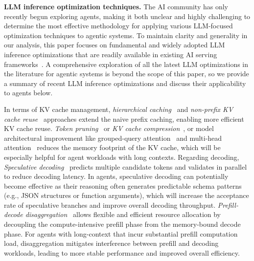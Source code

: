 \textbf{LLM inference optimization techniques.}
The AI community has only recently begun exploring agents, making it both unclear and highly challenging to determine the most effective methodology for applying various LLM-focused optimization techniques to agentic systems. To maintain clarity and generality in our analysis, this paper focuses on fundamental and widely adopted LLM inference optimizations that are readily available in existing AI serving frameworks~\cite{vllm,zheng2024sglang}. A comprehensive exploration of all the latest LLM optimizations in the literature for agentic systems is beyond the scope of this paper, so we provide a summary of recent LLM inference optimizations and discuss their applicability to agents below. 

In terms of KV cache management, \textit{hierarchical caching}~\cite{cachedattention,infinigen,multiturn} and \textit{non-prefix KV cache reuse}~\cite{cacheblend} approaches extend the naive prefix caching, enabling more efficient KV cache reuse. \textit{Token pruning}~\cite{dejavu,keyformer,attentionsink} or \textit{KV cache compression}~\cite{minicache,kvcachegen}, or model architectural improvement like grouped-query attention~\cite{ainslie2023gqa} and multi-head attention~\cite{liu2024deepseek} reduces the memory footprint of the KV cache, which will be especially helpful for agent workloads with long contexts.  Regarding decoding, \textit{Speculative decoding}~\cite{Leviathan2023SpecDecode} predicts multiple candidate tokens and validates in parallel to reduce decoding latency. In agents, speculative decoding can potentially become effective as their reasoning often generates predictable schema patterns (e.g., JSON structures or function arguments), which will increase the acceptance rate of speculative branches and improve overall decoding throughput. \textit{Prefill-decode disaggregation}~\cite{splitwise,distserve,dynamo} allows flexible and efficient resource allocation by decoupling the compute-intensive prefill phase from the memory-bound decode phase. For agents with long-context that incur substantial prefill computation load, disaggregation mitigates interference between prefill and decoding workloads, leading to more stable performance and improved overall efficiency.
